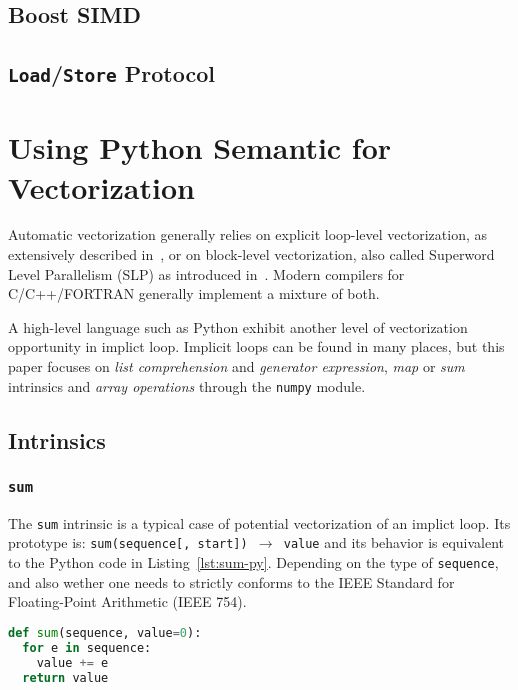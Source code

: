 \documentclass[preprint]{sigplanconf}
\begin{document}
\subsection{Boost SIMD}

\subsection{\texttt{Load}/\texttt{Store} Protocol}


\section{Using Python Semantic for Vectorization}
\label{sec:python-semantic}

Automatic vectorization generally relies on explicit loop-level vectorization, as
extensively described in~\cite{bik04}, or on block-level vectorization, also
called Superword Level Parallelism (SLP) as introduced in~\cite{larsen00}.
Modern compilers for C/C++/FORTRAN generally implement a mixture of both.

A high-level language such as Python exhibit another level of vectorization
opportunity in implict loop. Implicit loops can be found in many places, but
this paper focuses on \emph{list comprehension} and \emph{generator
expression}, \emph{map} or \emph{sum} intrinsics and \emph{array operations}
through the \texttt{numpy} module.

\subsection{Intrinsics}

\subsubsection{\texttt{sum}}

The \texttt{sum} intrinsic is a typical case of potential vectorization of an
implict loop. Its prototype is: \texttt{sum(sequence[, start]) $\rightarrow$
value} and its behavior is equivalent to the Python code in
Listing~\ref{lst:sum-py}. Depending on the type of \texttt{sequence}, and also
wether one needs to strictly conforms to the IEEE Standard for Floating-Point
Arithmetic (IEEE 754).

\begin{lstlisting}[language=python, label={lst:sum-py}, caption={Pseudo code of the \texttt{sum} intrinsic.}]
def sum(sequence, value=0):
  for e in sequence:
    value += e
  return value
\end{lstlisting}
\end{document}
